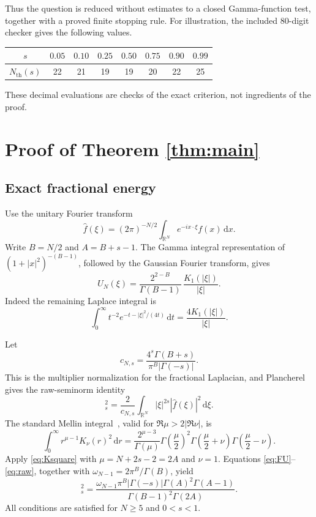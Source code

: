 \documentclass[11pt]{article}
\newcommand{\R}{\mathbb{R}}
\newcommand{\dd}{\,\mathrm{d}}
\begin{document}
Thus the question is reduced without estimates to a closed Gamma-function
test, together with a proved finite stopping rule. For illustration, the
included 80-digit checker gives the following values.
\begin{center}
\begin{tabular}{cccccccc}
\toprule
$s$ & $0.05$ & $0.10$ & $0.25$ & $0.50$ & $0.75$ & $0.90$ & $0.99$\\
\midrule
$N_{\mathrm{th}}(s)$ & 22 & 21 & 19 & 19 & 20 & 22 & 25\\
\bottomrule
\end{tabular}
\end{center}
These decimal evaluations are checks of the exact criterion, not ingredients
of the proof.

\section{Proof of Theorem \ref{thm:main}}

\subsection{Exact fractional energy}

Use the unitary Fourier transform
\[
 \widehat f(\xi)=(2\pi)^{-N/2}
 \int_{\R^N}e^{-ix\cdot\xi}f(x)\dd x.
\]
Write $B=N/2$ and $A=B+s-1$. The Gamma integral representation of
$(1+|x|^2)^{-(B-1)}$, followed by the Gaussian Fourier transform, gives
\begin{equation}
 \widehat U_N(\xi)=
 \frac{2^{2-B}}{\Gamma(B-1)}\,
 \frac{K_1(|\xi|)}{|\xi|}.                             \label{eq:FU}
\end{equation}
Indeed the remaining Laplace integral is
\[
 \int_0^\infty t^{-2}e^{-t-|\xi|^2/(4t)}\dd t
 =\frac{4K_1(|\xi|)}{|\xi|}.
\]

Let
\[
 c_{N,s}=\frac{4^s\Gamma(B+s)}{
 \pi^B|\Gamma(-s)|}.
\]
This is the multiplier normalization for the fractional Laplacian, and
Plancherel gives the raw-seminorm identity
\begin{equation}
 [f]_s^2=\frac{2}{c_{N,s}}
 \int_{\R^N}|\xi|^{2s}|\widehat f(\xi)|^2\dd\xi.
                                                               \label{eq:raw}
\end{equation}
The standard Mellin integral~\cite[Section 10.43]{dlmf}, valid for
$\Re\mu>2|\Re\nu|$, is
\begin{equation}
 \int_0^\infty r^{\mu-1}K_\nu(r)^2\dd r
 =\frac{2^{\mu-3}}{\Gamma(\mu)}
 \Gamma\!\left(\frac{\mu}{2}\right)^2
 \Gamma\!\left(\frac{\mu}{2}+\nu\right)
 \Gamma\!\left(\frac{\mu}{2}-\nu\right).            \label{eq:Ksquare}
\end{equation}
Apply \eqref{eq:Ksquare} with $\mu=N+2s-2=2A$ and $\nu=1$.
Equations \eqref{eq:FU}--\eqref{eq:raw}, together with
$\omega_{N-1}=2\pi^B/\Gamma(B)$, yield
\begin{equation}
 [U_N]_s^2=
 \frac{\omega_{N-1}\pi^B|\Gamma(-s)|
 \Gamma(A)^2\Gamma(A-1)}{
 \Gamma(B-1)^2\Gamma(2A)}.                              \label{eq:rawU}
\end{equation}
All conditions are satisfied for $N\geq5$ and $0<s<1$.
\end{document}
